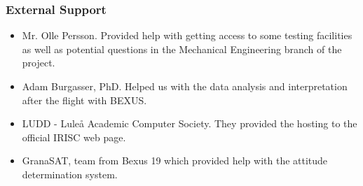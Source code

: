 



\subsubsection{External Support}

\begin{itemize}
	\item Mr. Olle Persson. Provided help with getting access to some testing facilities as well as potential questions in the Mechanical Engineering branch of the project.
	\item Adam Burgasser, PhD. Helped us with the data analysis and interpretation after the flight with BEXUS.
	\item LUDD - Luleå Academic Computer Society. They provided the hosting to the official IRISC web page.
	\item GranaSAT, team from Bexus 19 which provided help with the attitude determination system.
\end{itemize}
